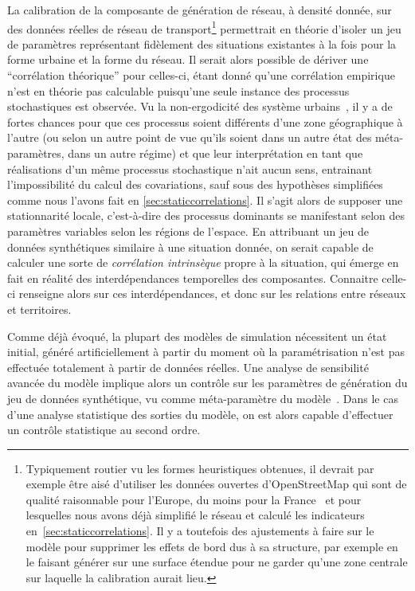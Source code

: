 {La calibration de la composante de génération de réseau, à densité donnée, sur des données réelles de réseau de transport\footnote{Typiquement routier vu les formes heuristiques obtenues, il devrait par exemple être aisé d'utiliser les données ouvertes d'OpenStreetMap qui sont de qualité raisonnable pour l'Europe, du moins pour la France~\cite{girres2010quality} et pour lesquelles nous avons déjà simplifié le réseau et calculé les indicateurs en~\ref{sec:staticcorrelations}. Il y a toutefois des ajustements à faire sur le modèle pour supprimer les effets de bord dus à sa structure, par exemple en le faisant générer sur une surface étendue pour ne garder qu'une zone centrale sur laquelle la calibration aurait lieu.} permettrait en théorie d'isoler un jeu de paramètres représentant fidèlement des situations existantes à la fois pour la forme urbaine et la forme du réseau. Il serait alors possible de dériver une ``corrélation théorique'' pour celles-ci, étant donné qu'une corrélation empirique n'est en théorie pas calculable puisqu'une seule instance des processus stochastiques est observée. Vu la non-ergodicité des système urbains~\cite{pumain2012urban}, il y a de fortes chances pour que ces processus soient différents d'une zone géographique à l'autre (ou selon un autre point de vue qu'ils soient dans un autre état des méta-paramètres, dans un autre régime) et que leur interprétation en tant que réalisations d'un même processus stochastique n'ait aucun sens, entrainant l'impossibilité du calcul des covariations, sauf sous des hypothèses simplifiées comme nous l'avons fait en \ref{sec:staticcorrelations}. Il s'agit alors de supposer une stationnarité locale, c'est-à-dire des processus dominants se manifestant selon des paramètres variables selon les régions de l'espace. En attribuant un jeu de données synthétiques similaire à une situation donnée, on serait capable de calculer une sorte de \emph{corrélation intrinsèque} propre à la situation, qui émerge en fait en réalité des interdépendances temporelles des composantes. Connaitre celle-ci renseigne alors sur ces interdépendances, et donc sur les relations entre réseaux et territoires.


Comme déjà évoqué, la plupart des modèles de simulation nécessitent un état initial, généré artificiellement à partir du moment où la paramétrisation n'est pas effectuée totalement à partir de données réelles. Une analyse de sensibilité avancée du modèle implique alors un contrôle sur les paramètres de génération du jeu de données synthétique, vu comme méta-paramètre du modèle~\cite{cottineau2015revisiting}. Dans le cas d'une analyse statistique des sorties du modèle, on est alors capable d'effectuer un contrôle statistique au second ordre.

}
